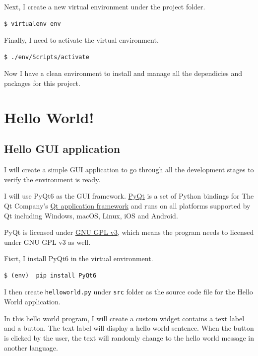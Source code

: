 \documentclass[a4paper]{report}
\begin{document}
Next, I create a new virtual environment under the project folder.

\begin{verbatim}
$ virtualenv env
\end{verbatim}

Finally, I need to activate the virtual environment.

\begin{verbatim}
$ ./env/Scripts/activate
\end{verbatim}

Now I have a clean environment to install and manage all the dependicies and packages for this project.

\section{Hello World!}

\subsection{Hello GUI application}

I will create a simple GUI application to go through all the development stages to verify the environment is ready.

I will use PyQt6 as the GUI framework. \href{https://riverbankcomputing.com/software/pyqt}{PyQt} is a set of Python bindings for The Qt Company's \href{https://www.qt.io/}{Qt application framework} and runs on all platforms supported by Qt including Windows, macOS, Linux, iOS and Android.

PyQt is licensed under \href{https://www.gnu.org/licenses/gpl-3.0.en.html}{GNU GPL v3}, which means the program needs to licensed under GNU GPL v3 as well.

Fisrt, I install PyQt6 in the virtual environment.

\begin{verbatim}
$ (env)  pip install PyQt6
\end{verbatim}

I then create \texttt{helloworld.py} under \texttt{src} folder as the source code file for the Hello World application.

In this hello world program, I will create a custom widget contains a text label and a button. The text label will display a hello world sentence. When the button is clicked by the user, the text will randomly change to the hello world message in another language.
\end{document}
